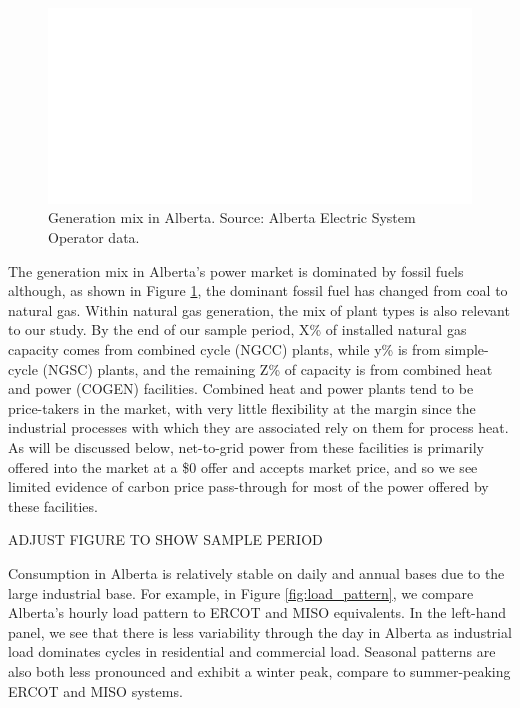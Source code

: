 \documentclass[12pt]{article}
\begin{document}
\begin{figure}[t]%
	\centering \vspace{-.25cm} \includegraphics[width=6.5in]{../images/gen_fuel.png}
\vspace{-0.75cm}	\caption{Generation mix in Alberta.  Source: Alberta Electric System Operator data.}
\label{fig:gen_mix}
\end{figure}


The generation mix in Alberta's power market is dominated by fossil fuels although, as shown in Figure \ref{fig:gen_mix}, the dominant fossil fuel has changed from coal to natural gas. Within natural gas generation, the mix of plant types is also relevant to our study. By the end of our sample period, X\% of installed natural gas capacity comes from combined cycle (NGCC) plants, while y\% is from simple-cycle (NGSC) plants, and the remaining Z\% of capacity is from combined heat and power (COGEN) facilities. Combined heat and power plants tend to be price-takers in the market, with very little flexibility at the margin since the industrial processes with which they are associated rely on them for process heat. As will be discussed below, net-to-grid power from these facilities is primarily offered into the market at a \$0 offer and accepts market price, and so we see limited evidence of carbon price pass-through for most of the power offered by these facilities.


ADJUST FIGURE TO SHOW SAMPLE PERIOD

Consumption in Alberta is relatively stable on daily and annual bases due to the large industrial base. For example, in Figure \ref{fig:load_pattern}, we compare Alberta's hourly load pattern to ERCOT and MISO equivalents. In the left-hand panel, we see that there is less variability through the day in Alberta as industrial load dominates cycles in residential and commercial load. Seasonal patterns are also both less pronounced and exhibit a winter peak, compare to summer-peaking ERCOT and MISO systems.
\end{document}
